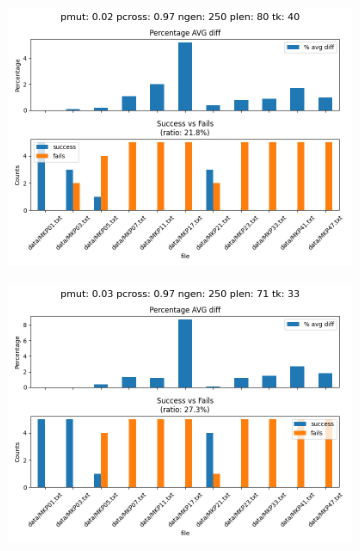 \begin{figure}[H]
    \begin{subfigure}{.3\textwidth}
        \includegraphics[width=\textwidth]{img/tuning/tuning_results_2_97_250_80_40.png}
    \end{subfigure}
    \begin{subfigure}{.3\textwidth}
        \includegraphics[width=\textwidth]{img/tuning/tuning_results_3_97_250_71_33.png}
    \end{subfigure}
    \begin{subfigure}{.3\textwidth}

\end{subfigure}
\end{figure}
